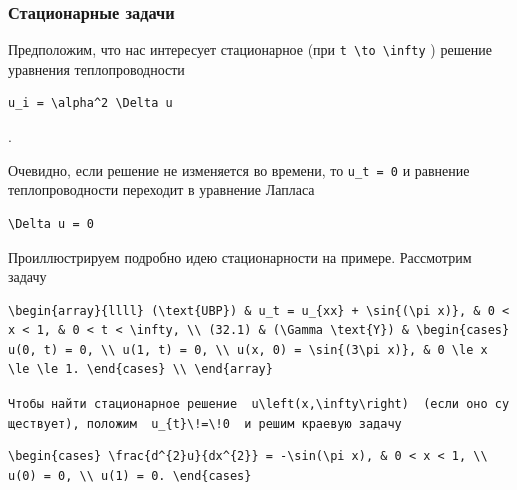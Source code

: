 \documentclass[
  ukrainian,
]{article}
\begin{document}
\subsubsection{Стационарные
задачи}\label{ux441ux442ux430ux446ux438ux43eux43dux430ux440ux43dux44bux435-ux437ux430ux434ux430ux447ux438}

Предположим, что нас интересует стационарное (при
\texttt{t\ \textbackslash{}to\ \textbackslash{}infty} ) решение
уравнения теплопроводности

\begin{verbatim}
u_i = \alpha^2 \Delta u
\end{verbatim}

.

Очевидно, если решение не изменяется во времени, то \texttt{u\_t\ =\ 0}
и равнение теплопроводности переходит в уравнение Лапласа

\begin{verbatim}
\Delta u = 0
\end{verbatim}

Проиллюстрируем подробно идею стационарности на примере. Рассмотрим
задачу

\begin{verbatim}
\begin{array}{llll} (\text{UBP}) & u_t = u_{xx} + \sin{(\pi x)}, & 0 < x < 1, & 0 < t < \infty, \\ (32.1) & (\Gamma \text{Y}) & \begin{cases} u(0, t) = 0, \\ u(1, t) = 0, \\ u(x, 0) = \sin{(3\pi x)}, & 0 \le x \le \le 1. \end{cases} \\ \end{array}
\end{verbatim}

\texttt{Чтобы\ найти\ стационарное\ решение\ \ \textquotesingle{}u\textbackslash{}left(x,\textbackslash{}infty\textbackslash{}right)\textquotesingle{}\ \ (если\ оно\ существует),\ положим\ \ \textquotesingle{}u\_\{t\}\textbackslash{}!=\textbackslash{}!0\textquotesingle{}\ \ и\ решим\ краевую\ задачу}

\begin{verbatim}
\begin{cases} \frac{d^{2}u}{dx^{2}} = -\sin(\pi x), & 0 < x < 1, \\ u(0) = 0, \\ u(1) = 0. \end{cases}
\end{verbatim}
\end{document}
